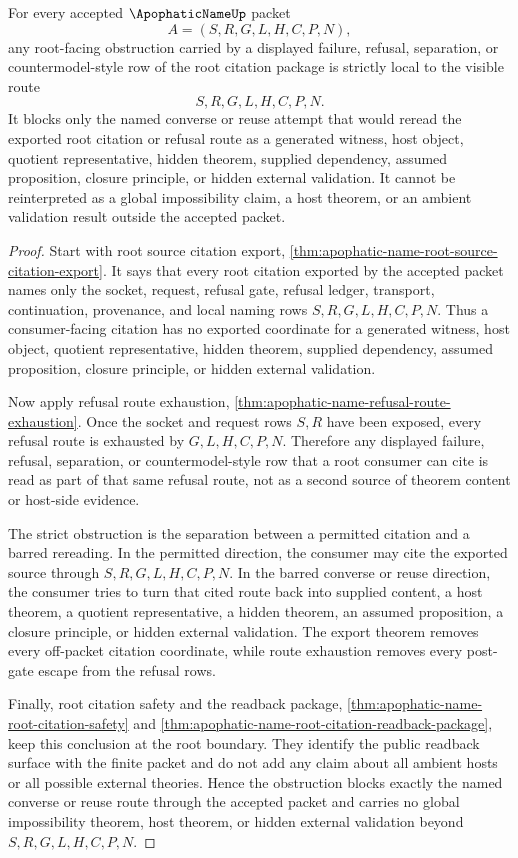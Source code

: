 \begin{corollary}
\label{cor:apophatic-name-root-citation-safety-strict-obstruction}
For every accepted $\ApophaticNameUp$ packet
$$
A=(S,R,G,L,H,C,P,N),
$$
any root-facing obstruction carried by a displayed failure, refusal, separation, or countermodel-style row of the root citation package is strictly local to the visible route
$$
S,R,G,L,H,C,P,N.
$$
It blocks only the named converse or reuse attempt that would reread the exported root citation or refusal route as a generated witness, host object, quotient representative, hidden theorem, supplied dependency, assumed proposition, closure principle, or hidden external validation. It cannot be reinterpreted as a global impossibility claim, a host theorem, or an ambient validation result outside the accepted packet.
\end{corollary}
\begin{proof}
Start with root source citation export, \autoref{thm:apophatic-name-root-source-citation-export}. It says that every root citation exported by the accepted packet names only the socket, request, refusal gate, refusal ledger, transport, continuation, provenance, and local naming rows $S,R,G,L,H,C,P,N$. Thus a consumer-facing citation has no exported coordinate for a generated witness, host object, quotient representative, hidden theorem, supplied dependency, assumed proposition, closure principle, or hidden external validation.

Now apply refusal route exhaustion, \autoref{thm:apophatic-name-refusal-route-exhaustion}. Once the socket and request rows $S,R$ have been exposed, every refusal route is exhausted by $G,L,H,C,P,N$. Therefore any displayed failure, refusal, separation, or countermodel-style row that a root consumer can cite is read as part of that same refusal route, not as a second source of theorem content or host-side evidence.

The strict obstruction is the separation between a permitted citation and a barred rereading. In the permitted direction, the consumer may cite the exported source through $S,R,G,L,H,C,P,N$. In the barred converse or reuse direction, the consumer tries to turn that cited route back into supplied content, a host theorem, a quotient representative, a hidden theorem, an assumed proposition, a closure principle, or hidden external validation. The export theorem removes every off-packet citation coordinate, while route exhaustion removes every post-gate escape from the refusal rows.

Finally, root citation safety and the readback package, \autoref{thm:apophatic-name-root-citation-safety} and \autoref{thm:apophatic-name-root-citation-readback-package}, keep this conclusion at the root boundary. They identify the public readback surface with the finite packet and do not add any claim about all ambient hosts or all possible external theories. Hence the obstruction blocks exactly the named converse or reuse route through the accepted packet and carries no global impossibility theorem, host theorem, or hidden external validation beyond $S,R,G,L,H,C,P,N$.
\end{proof}
